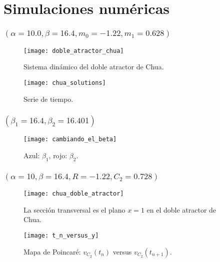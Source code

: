 \section{Simulaciones numéricas}

\begin{frame}
	\frametitle{\secname\quad$\left(\alpha=10.0, \beta=16.4, m_{0}=-1.22, m_{1}=0.628\right)$}

	\begin{minipage}{0.45\textwidth}
		\begin{figure}[ht!]
			\centering
			\texttt{[image: doble\_atractor\_chua]}
			\caption{Sistema dinámico del doble atractor de Chua.}\label{fig:doble_atractor_chua}
		\end{figure}
	\end{minipage}
	\begin{minipage}{0.45\textwidth}
		\begin{figure}[ht!]
			\centering
			\texttt{[image: chua\_solutions]}
			\caption{Serie de tiempo.}\label{fig:chua_solutions}
		\end{figure}
	\end{minipage}
\end{frame}

\begin{frame}
	\frametitle{\secname\quad$\left(\beta_{1}=16.4,\beta_{2}=16.401\right)$}

	\begin{figure}[ht!]
		\centering
		\texttt{[image: cambiando\_el\_beta]}
		\caption{Azul: $\beta_{1}$, rojo: $\beta_{2}$.}\label{fig:lyapunov}
	\end{figure}

\end{frame}

\begin{frame}
	\frametitle{\secname\quad$\left(\alpha=10,\beta=16.4,R=-1.22,C_{2}=0.728\right)$}

	\begin{minipage}{0.45\textwidth}
		\begin{figure}[ht!]
			\centering
			\texttt{[image: chua\_doble\_atractor]}
			\caption{La sección transversal es el plano $x=1$ en el doble atractor de Chua.}\label{fig:chua_doble_atractor}
		\end{figure}
	\end{minipage}
	\begin{minipage}{0.45\textwidth}
		\begin{figure}[ht!]
			\centering
			\texttt{[image: t\_n\_versus\_y]}
			\caption{Mapa de Poincaré: $v_{C_{2}}\left(t_{n}\right)$ versus $v_{C_{2}}\left(t_{n+1}\right)$.}\label{fig:chua_solutions}
		\end{figure}
	\end{minipage}
\end{frame}

